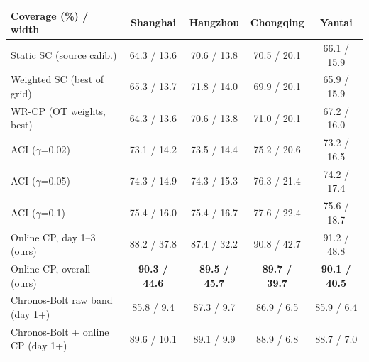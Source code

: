 \begin{tabular}{lcccc}
\toprule
Coverage (\%) / width & Shanghai & Hangzhou & Chongqing & Yantai \\
\midrule
Static SC (source calib.) & 64.3 / 13.6 & 70.6 / 13.8 & 70.5 / 20.1 & 66.1 / 15.9 \\
Weighted SC (best of grid) & 65.3 / 13.7 & 71.8 / 14.0 & 69.9 / 20.1 & 65.9 / 15.9 \\
WR-CP (OT weights, best) & 64.3 / 13.6 & 70.6 / 13.8 & 71.0 / 20.1 & 67.2 / 16.0 \\
ACI ($\gamma$=0.02) & 73.1 / 14.2 & 73.5 / 14.4 & 75.2 / 20.6 & 73.2 / 16.5 \\
ACI ($\gamma$=0.05) & 74.3 / 14.9 & 74.3 / 15.3 & 76.3 / 21.4 & 74.2 / 17.4 \\
ACI ($\gamma$=0.1) & 75.4 / 16.0 & 75.4 / 16.7 & 77.6 / 22.4 & 75.6 / 18.7 \\
Online CP, day 1--3 (ours) & 88.2 / 37.8 & 87.4 / 32.2 & 90.8 / 42.7 & 91.2 / 48.8 \\
Online CP, overall (ours) & \textbf{90.3 / 44.6} & \textbf{89.5 / 45.7} & \textbf{89.7 / 39.7} & \textbf{90.1 / 40.5} \\
\midrule
Chronos-Bolt raw band (day 1+) & 85.8 / 9.4 & 87.3 / 9.7 & 86.9 / 6.5 & 85.9 / 6.4 \\
Chronos-Bolt + online CP (day 1+) & 89.6 / 10.1 & 89.1 / 9.9 & 88.9 / 6.8 & 88.7 / 7.0 \\
\bottomrule
\end{tabular}
